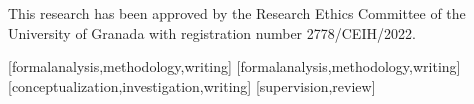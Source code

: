 \documentclass[english]{textolivre}
\begin{document}
This research has been approved by the Research Ethics Committee of the University of Granada with registration number 2778/CEIH/2022.


\printbibliography\label{sec-bib}


\begin{contributors}
[formalanalysis,methodology,writing]
[formalanalysis,methodology,writing]
[conceptualization,investigation,writing]
[supervision,review]
\end{contributors}
\end{document}
